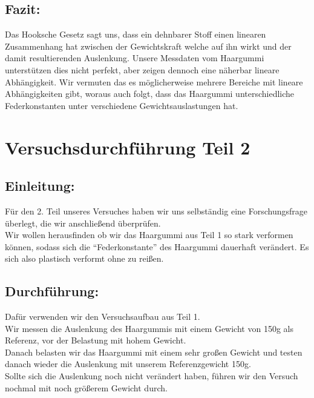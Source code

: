 \documentclass[11pt]{article}
\begin{document}
    \subsection{Fazit:} Das Hooksche Gesetz sagt uns, dass ein dehnbarer Stoff
    einen linearen Zusammenhang hat zwischen der Gewichtskraft welche auf
    ihn wirkt und der damit resultierenden Auslenkung. Unsere Messdaten vom
    Haargummi unterstützen dies nicht perfekt, aber zeigen dennoch eine
    näherbar lineare Abhängigkeit. Wir vermuten das es möglicherweise
    mehrere Bereiche mit lineare Abhängigkeiten gibt, woraus auch folgt,
    dass das Haargummi unterschiedliche Federkonstanten unter verschiedene
    Gewichtsauslastungen hat.
    \newpage

    \section{Versuchsdurchführung Teil 2}\label{versuchsdurchfuxfchrung-teil-2}

    \subsection{Einleitung:}\label{einleitung}
    Für den 2. Teil unseres Versuches haben wir uns selbständig eine
    Forschungsfrage überlegt, die wir anschließend überprüfen.\\
    Wir wollen herausfinden ob wir das Haargummi aus Teil 1 so stark
    verformen können, sodass sich die ``Federkonstante'' des Haargummi
    dauerhaft verändert. Es sich also plastisch verformt ohne zu reißen.

    \subsection{Durchführung:}\label{durchfuxfchrung}
    Dafür verwenden wir den Versuchsaufbau aus Teil 1.\\
    Wir messen die Auslenkung des Haargummis mit einem Gewicht von 150g als
    Referenz, vor der Belastung mit hohem Gewicht.\\
    Danach belasten wir das Haargummi mit einem sehr großen Gewicht und
    testen danach wieder die Auslenkung mit unserem Referenzgewicht 150g.\\
    Sollte sich die Auslenkung noch nicht verändert haben, führen wir den
    Versuch nochmal mit noch größerem Gewicht durch.
\end{document}
